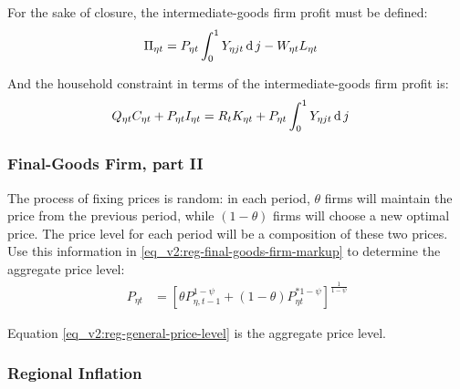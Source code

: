\documentclass[../thesis.tex]{subfiles}
\begin{document}


For the sake of closure, the intermediate-goods firm profit must be defined:
\begin{align}
	\Pi_{\eta t} &= P_{\eta t} \int_{0}^{1} Y_{\eta jt} \operatorname{d} j - W_{\eta t} L_{\eta t} \label{eq_v2:reg-int-good-firm-profit-total-2}
\end{align}

And the household constraint in terms of the intermediate-goods firm profit is:
\begin{align}
	& Q_{\eta t} C_{\eta t} + P_{\eta t} I_{\eta t} = R_{t} K_{\eta t} + P_{\eta t} \int_{0}^{1} Y_{\eta jt} \operatorname{d} j \label{eq_v2:reg-budget-constraint-3}
\end{align}


\subsubsection{Final-Goods Firm, part II}

The process of fixing prices is random: in each period, $\theta$ firms will maintain the price from the previous period, while $(1-\theta)$ firms will choose a new optimal price. The price level for each period will be a composition of these two prices. Use this information in \ref{eq_v2:reg-final-goods-firm-markup} to determine the aggregate price level:
\begin{align}
	P_{\eta t} & = \left[ \theta P_{\eta, t-1}^{1-\psi} + (1-\theta) P_{\eta t}^{\ast 1-\psi} \right]^\frac{1}{1-\psi} \label{eq_v2:reg-general-price-level}
\end{align}

Equation \ref{eq_v2:reg-general-price-level} is the aggregate price level.


\subsubsection{Regional Inflation}
\end{document}

